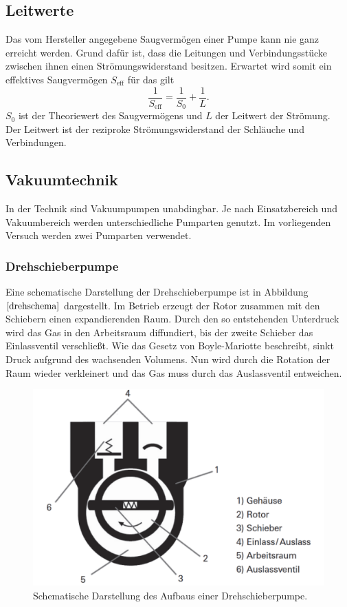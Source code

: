 \subsection{Leitwerte}
Das vom Hersteller angegebene Saugvermögen einer Pumpe kann nie ganz erreicht werden.
Grund dafür ist, dass die Leitungen und Verbindungsstücke zwischen ihnen einen Strömungswiderstand besitzen.
Erwartet wird somit ein effektives Saugvermögen $S_\text{eff}$ für das gilt
\begin{equation}
  \frac{1}{S_\text{eff}}=\frac{1}{S_0}+\frac{1}{L}.
\end{equation}
$S_0$ ist der Theoriewert des Saugvermögens und $L$ der Leitwert der Strömung.\\
Der Leitwert ist der reziproke Strömungswiderstand der Schläuche und Verbindungen.
\subsection{Vakuumtechnik}
In der Technik sind Vakuumpumpen unabdingbar.
Je nach Einsatzbereich und Vakuumbereich werden unterschiedliche Pumparten genutzt.
Im vorliegenden Versuch werden zwei Pumparten verwendet.\\
\subsubsection{Drehschieberpumpe}
Eine schematische Darstellung der Drehschieberpumpe ist in Abbildung $\ref{drehschema}$ dargestellt. Im Betrieb erzeugt der Rotor zusammen mit den Schiebern einen expandierenden Raum. Durch den so entstehenden Unterdruck wird
das Gas in den Arbeitsraum diffundiert, bis der zweite Schieber das Einlassventil verschließt. Wie das Gesetz von Boyle-Mariotte beschreibt, sinkt Druck aufgrund des wachsenden Volumens.
Nun wird durch die Rotation der Raum wieder verkleinert und das Gas muss durch das Auslassventil entweichen.
\begin{figure}[H]
  \centering
  \includegraphics[scale=0.4]{Bilder/drehschieber.png}
  \caption{Schematische Darstellung des Aufbaus einer Drehschieberpumpe.\cite{schemadreh}}
  \label{drehschema}
\end{figure}

